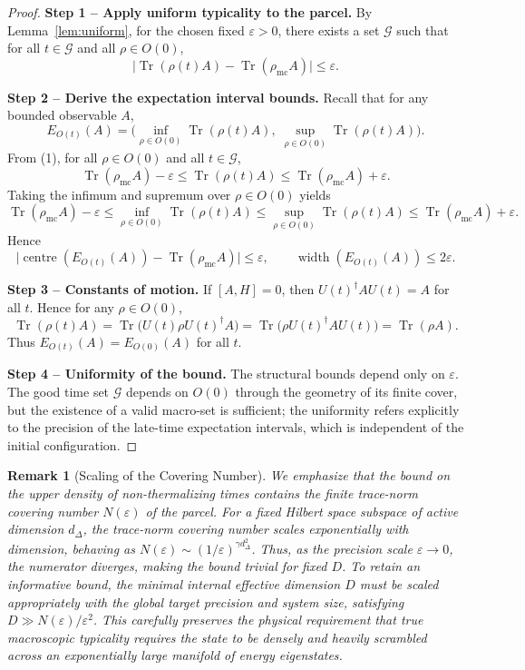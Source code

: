 \documentclass[11pt, onecolumn]{article}
\newtheorem{remark}{Remark}
\begin{document}
\begin{proof}
\textbf{Step 1 -- Apply uniform typicality to the parcel.}  
By Lemma~\ref{lem:uniform}, for the chosen fixed \(\varepsilon>0\), there exists a set \(\mathcal{G}\) such that for all \(t\in\mathcal{G}\) and all \(\rho\in O(0)\),
\[
\bigl|\operatorname{Tr}(\rho(t)A)-\operatorname{Tr}(\rho_{\mathrm{mc}}A)\bigr| \le \varepsilon. \tag{1}
\]

\textbf{Step 2 -- Derive the expectation interval bounds.}  
Recall that for any bounded observable \(A\),
\[
E_{O(t)}(A) = \bigl(\inf_{\rho\in O(0)}\operatorname{Tr}(\rho(t)A),\; \sup_{\rho\in O(0)}\operatorname{Tr}(\rho(t)A)\bigr).
\]
From (1), for all \(\rho\in O(0)\) and all \(t\in\mathcal{G}\),
\[
\operatorname{Tr}(\rho_{\mathrm{mc}}A)-\varepsilon \le \operatorname{Tr}(\rho(t)A) \le \operatorname{Tr}(\rho_{\mathrm{mc}}A)+\varepsilon.
\]
Taking the infimum and supremum over \(\rho\in O(0)\) yields
\[
\operatorname{Tr}(\rho_{\mathrm{mc}}A)-\varepsilon \le \inf_{\rho\in O(0)}\operatorname{Tr}(\rho(t)A) \le \sup_{\rho\in O(0)}\operatorname{Tr}(\rho(t)A) \le \operatorname{Tr}(\rho_{\mathrm{mc}}A)+\varepsilon.
\]
Hence
\[
\bigl|\operatorname{centre}(E_{O(t)}(A))-\operatorname{Tr}(\rho_{\mathrm{mc}}A)\bigr| \le \varepsilon,\qquad
\operatorname{width}(E_{O(t)}(A)) \le 2\varepsilon.
\]

\textbf{Step 3 -- Constants of motion.}  
If \([A,H]=0\), then \(U(t)^\dagger A U(t)=A\) for all \(t\). Hence for any \(\rho\in O(0)\),
\[
\operatorname{Tr}(\rho(t)A) = \operatorname{Tr}\bigl(U(t)\rho U(t)^\dagger A\bigr)
= \operatorname{Tr}\bigl(\rho U(t)^\dagger A U(t)\bigr) = \operatorname{Tr}(\rho A).
\]
Thus \(E_{O(t)}(A)=E_{O(0)}(A)\) for all \(t\).

\textbf{Step 4 -- Uniformity of the bound.}  
The structural bounds depend only on \(\varepsilon\). The good time set \(\mathcal{G}\) depends on \(O(0)\) through the geometry of its finite cover, but the existence of a valid macro-set is sufficient; the uniformity refers explicitly to the precision of the late-time expectation intervals, which is independent of the initial configuration. 
\end{proof}

\begin{remark}[Scaling of the Covering Number]
We emphasize that the bound on the upper density of non-thermalizing times contains the finite trace-norm covering number \(N(\varepsilon)\) of the parcel. For a fixed Hilbert space subspace of active dimension \(d_\Delta\), the trace-norm covering number scales exponentially with dimension, behaving as \(N(\varepsilon) \sim (1/\varepsilon)^{\gamma d_\Delta^2}\). Thus, as the precision scale \(\varepsilon \to 0\), the numerator diverges, making the bound trivial for fixed \(D\). To retain an informative bound, the minimal internal effective dimension \(D\) must be scaled appropriately with the global target precision and system size, satisfying \(D \gg N(\varepsilon)/\varepsilon^2\). This carefully preserves the physical requirement that true macroscopic typicality requires the state to be densely and heavily scrambled across an exponentially large manifold of energy eigenstates.
\end{remark}
\end{document}
